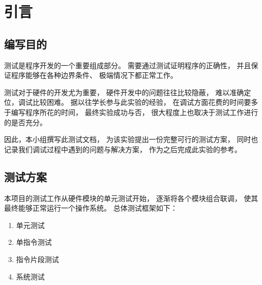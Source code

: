 \section{引言}
    \subsection{编写目的}
        测试是程序开发的一个重要组成部分。%
        需要通过测试证明程序的正确性，%
        并且保证程序能够在各种边界条件、%
        极端情况下都正常工作。%

        测试对于硬件的开发尤为重要，%
        硬件开发中的问题往往比较隐蔽，%
        难以准确定位，调试比较困难。%
        据以往学长参与此实验的经验，%
        在调试方面花费的时间要多于编写程序所花的时间，%
        最终实验成功与否，%
        很大程度上也取决于测试工作进行的是否充分。

        因此，本小组撰写此测试文档，%
        为该实验提出一份完整可行的测试方案，%
        同时也记录我们调试过程中遇到的问题与解决方案，%
        作为之后完成此实验的参考。

    \subsection{测试方案}
        本项目的测试工作从硬件模块的单元测试开始，%
        逐渐将各个模块组合联调，%
        使其最终能够正常运行一个操作系统。%
        总体测试框架如下：
        \begin{enumerate}
        \item
            单元测试
        \item
            单指令测试
        \item
            指令片段测试
        \item
            系统测试
        \end{enumerate}